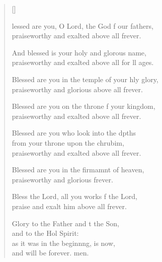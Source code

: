 \settowidth{\versewidth}{Blessed are you in the temple of your holy glory, *}
\begin{verse}[\versewidth]
  \begin{patverse}
lessed are you, O Lord, the God f our fathers,\Med\\
praiseworthy and exalted above all frever.

And blessed is your holy and glor\pointup{\i}ous name,\Med\\
praiseworthy and exalted above all for ll ages.

Blessed are you in the temple of your hly glory,\Med\\
praiseworthy and glorious above all frever.

Blessed are you on the throne f your kingdom,\Med\\
praiseworthy and exalted above all frever.

Blessed are you who look into the dpths\Flex\\
from your throne upon the chrubim,\Med\\
praiseworthy and exalted above all frever.

Blessed are you in the firmamnt of heaven,\Med\\
praiseworthy and glorious frever.

Bless the Lord, all you works f the Lord,\Med\\
praise and exalt him above all frever.

Glory to the Father and t the Son,\Med\\
and to the Hol Spirit:\\
as it was in the beginn\pointup{\i}ng, is now,\Med\\
and will be forever. men. 
  \end{patverse}
\end{verse}

